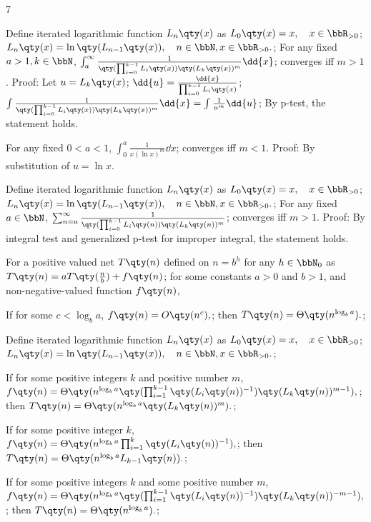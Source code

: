 \documentclass[a4paper,10pt]{extarticle}
\begin{document}
\begin{multicols}{7}

Define iterated logarithmic function $L_n\qty(x)$ as
\(L_{0}\qty(x)=x,\quad x\in\bbR_{>0}\); 
\(L_{n}\qty(x)=\ln\qty(L_{n-1}\qty(x)),\quad n\in\bbN,x\in\bbR_{>0}.\); 
For any fixed $a>1,k\in\bbN$,
\(\int_a^{\infty}\frac{1}{\qty(\prod_{i=0}^{k-1}L_{i}\qty(x))\qty(L_{k}\qty(x))^m}\dd{x}\); 
converges iff $m>1$.
Proof:
Let
\(u=L_k\qty(x)\); 
\(\dd{u}=\frac{\dd{x}}{\prod_{i=0}^{k-1}L_{i}\qty(x)}\); 
\(\int\frac{1}{\qty(\prod_{i=0}^{k-1}L_{i}\qty(x))\qty(L_{k}\qty(x))^m}\dd{x}=\int\frac{1}{u^m}\dd{u}\); 
By p-test, the statement holds.

For any fixed $0<a<1$,
\(\int_0^a\frac{1}{x(\ln x)^m}\dd{x}\); 
converges iff $m<1$.
Proof:
By substitution of $u=\ln x$.



Define iterated logarithmic function $L_n\qty(x)$ as
\(L_{0}\qty(x)=x,\quad x\in\bbR_{>0}\); 
\(L_{n}\qty(x)=\ln\qty(L_{n-1}\qty(x)),\quad n\in\bbN,x\in\bbR_{>0}.\); 
For any fixed $a\in\bbN$,
\(\sum_{n=a}^{\infty}\frac{1}{\qty(\prod_{i=0}^{k-1}L_{i}\qty(n))\qty(L_{k}\qty(n))^m}\); 
converges iff $m>1$.
Proof:
By integral test and generalized p-test for improper integral, the statement holds.



For a positive valued net $T\qty(n)$ defined on $n=b^h$ for any $h\in\bbN_0$ as
\(T\qty(n)=aT\qty(\frac{n}{b})+f\qty(n)\); 
for some constants $a>0$ and $b>1$, and non-negative-valued function $f\qty(n)$,

If for some $c<\log_ba$,
\(f\qty(n)=O\qty(n^c),\); 
then
\(T\qty(n)=\Theta\qty(n^{\log_ba}).\); 

Define iterated logarithmic function $L_n\qty(x)$ as
\(L_{0}\qty(x)=x,\quad x\in\bbR_{>0}\); 
\(L_{n}\qty(x)=\ln\qty(L_{n-1}\qty(x)),\quad n\in\bbN,x\in\bbR_{>0}.\); 

If for some positive integers $k$ and positive number $m$, 
\(f\qty(n)=\Theta\qty(n^{\log_ba}\qty(\prod_{i=1}^{k-1}\qty(L_{i}\qty(n))^{-1})\qty(L_{k}\qty(n))^{m-1}),\); 
then
\(T\qty(n)=\Theta\qty(n^{\log_ba}\qty(L_{k}\qty(n))^m).\); 

If for some positive integer $k$, 
\(f\qty(n)=\Theta\qty(n^{\log_ba}\prod_{i=1}^k\qty(L_{i}\qty(n))^{-1}),\); 
then
\(T\qty(n)=\Theta\qty(n^{\log_ba}L_{k-1}\qty(n)).\); 

If for some positive integers $k$ and some positive number $m$,
\(f\qty(n)=\Theta\qty(n^{\log_ba}\qty(\prod_{i=1}^{k-1}\qty(L_{i}\qty(n))^{-1})\qty(L_{k}\qty(n))^{-m-1}),\); 
then
\(T\qty(n)=\Theta\qty(n^{\log_ba}).\); 


\end{multicols}
\end{document}
